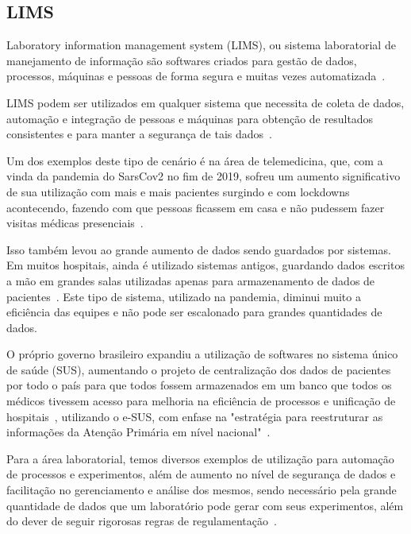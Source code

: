 \subsection{LIMS}


Laboratory information management system (LIMS), ou sistema laboratorial de manejamento de informação são softwares criados para gestão de dados, processos, máquinas e pessoas de forma segura e muitas vezes automatizada~\cite{Stafford1998LIMS:Technology}.


LIMS podem ser utilizados em qualquer sistema que necessita de coleta de dados, automação e integração de pessoas e máquinas para obtenção de resultados consistentes e para manter a segurança de tais dados~\cite{Sun2021LaboratoryEfficiency, TowardsXplore}.

Um dos exemplos deste tipo de cenário é na área de telemedicina, que, com a vinda da pandemia do SarsCov2 no fim de 2019, sofreu um aumento significativo de sua utilização com mais e mais pacientes surgindo e com lockdowns acontecendo, fazendo com que pessoas ficassem em casa e não pudessem fazer visitas médicas presenciais~\cite{kronenfeld2021, bakhtiar2020, GatesB.Colbert2020UtilityEra}.

Isso também levou ao grande aumento de dados sendo guardados por sistemas. Em muitos hospitais, ainda é utilizado sistemas antigos, guardando dados escritos a mão em grandes salas utilizadas apenas para armazenamento de dados de pacientes~\cite{2021TacklingMachine}. Este tipo de sistema, utilizado na pandemia, diminui muito a eficiência das equipes e não pode ser escalonado para grandes quantidades de dados.


O próprio governo brasileiro expandiu a utilização de softwares no sistema único de saúde (SUS), aumentando o projeto de centralização dos dados de pacientes por todo o país para que todos fossem armazenados em um banco que todos os médicos tivessem acesso para melhoria na eficiência de processos e unificação de hospitais~\cite{Araujo2021DesafiosCovid-19}, utilizando o e-SUS, com enfase na "estratégia para reestruturar as informações da Atenção Primária em nível nacional"~\cite{E-SUSAPS}.

Para a área laboratorial, temos diversos exemplos de utilização para automação de processos e experimentos, além de aumento no nível de segurança de dados e facilitação no gerenciamento e análise dos mesmos, sendo necessário pela grande quantidade de dados que um laboratório pode gerar com seus experimentos, além do dever de seguir rigorosas regras de regulamentação~\cite{Holzmuller-Laue2014ImprovedAutomation, Holzmuller-Laue2013Model-drivenLaboratories}.

